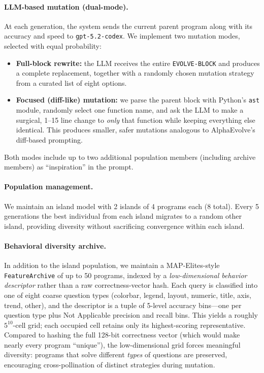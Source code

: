 \documentclass{article}
\begin{document}
\paragraph{LLM-based mutation (dual-mode).}
At each generation, the system sends the current parent program along with its
accuracy and speed to \texttt{gpt-5.2-codex}. We implement two mutation modes,
selected with equal probability:
\begin{itemize}
  \item \textbf{Full-block rewrite:} the LLM receives the entire
    \texttt{EVOLVE-BLOCK} and produces a complete replacement, together with a
    randomly chosen mutation strategy from a curated list of eight options.
  \item \textbf{Focused (diff-like) mutation:} we parse the parent block with
    Python's \texttt{ast} module, randomly select one function name, and ask the
    LLM to make a surgical, 1--15 line change to \emph{only} that function while
    keeping everything else identical. This produces smaller, safer mutations
    analogous to AlphaEvolve's diff-based prompting.
\end{itemize}
Both modes include up to two additional population members (including archive
members) as ``inspiration'' in the prompt.

\paragraph{Population management.}
We maintain an island model with 2 islands of 4 programs each (8 total). Every
5 generations the best individual from each island migrates to a random other
island, providing diversity without sacrificing convergence within each island.

\paragraph{Behavioral diversity archive.}
In addition to the island population, we maintain a MAP-Elites-style
\texttt{FeatureArchive} of up to 50 programs, indexed by a \emph{low-dimensional
behavior descriptor} rather than a raw correctness-vector hash.  Each query is
classified into one of eight coarse question types (colorbar, legend, layout,
numeric, title, axis, trend, other), and the descriptor is a tuple of
5-level accuracy bins---one per question type plus Not Applicable
precision and recall bins.  This yields a roughly $5^{10}$-cell grid;
each occupied cell retains only its highest-scoring representative.
Compared to hashing the full 128-bit correctness vector (which would
make nearly every program ``unique''), the low-dimensional grid forces
meaningful diversity: programs that solve different \emph{types} of
questions are preserved, encouraging cross-pollination of distinct
strategies during mutation.
\end{document}
